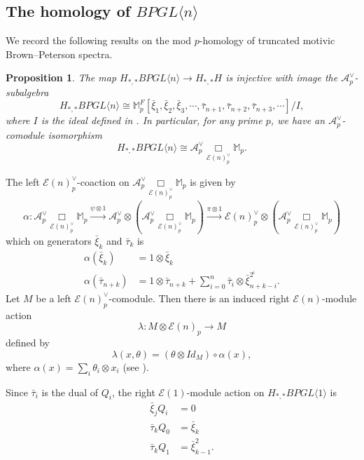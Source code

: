 \documentclass{amsart}
\newtheorem{proposition}[theorem]{Proposition}
\theoremstyle{plain}
\numberwithin{theorem}{section}
\numberwithin{equation}{section}
\numberwithin{figure}{section}
\newcommand{\mM}{{\mathbb M}}
\newcommand{\cA}{{\mathcal A}}
\newcommand{\cE}{{\mathcal E}}
\newcommand{\0}{\langle 0 \rangle }
\begin{document}
\subsection{The homology of $BPGL \langle n \rangle$}
We record the following results on the mod $p$-homology of truncated motivic Brown--Peterson spectra.
\begin{proposition} \cite[Theorem 6.19]{Hoyois15}
\label{prop:BPGLnHomology}
    The map $H_{*,*} BPGL \langle n \rangle \to H_{*,*} H$ is injective with image the $\mathcal{A}^\vee_p$-subalgebra
    \[
    H_{*,*} BPGL \langle n \rangle \cong \mathbb{M}_p^F [\bar{\xi}_1, \bar{\xi}_2, \bar{\xi}_3, \cdots, \bar{\tau}_{n+1}, \bar{\tau}_{n + 2}, \bar{\tau}_{n + 3}, \cdots]/I,
    \]
    where $I$ is the ideal defined in . In particular, for any prime $p$, we have an $\mathcal{A}_p^\vee$-comodule isomorphism 
    \[
    H_{*,*} BPGL \langle n \rangle \cong \cA_p^\vee \underset{\cE(n)^\vee_p}{\Box} \mathbb{M}_p
    .\]
\end{proposition}
The left $\cE(n)_p^\vee$-coaction on $\mathcal{A}_p^\vee \underset{\cE(n)_p^\vee}{\Box} \mM_p$ is given by
\begin{equation} \label{eq:coaction}
    \alpha: \mathcal{A}_p^\vee \underset{\cE(n)_p^\vee}{\Box} {\mM_p} \xrightarrow{\psi \otimes 1} \mathcal{A}_p^\vee \otimes \left(\mathcal{A}_p^\vee \underset{\cE(n)_p^\vee}{\Box} {\mM_p} \right) \xrightarrow{\pi \otimes 1} \cE(n)_p^\vee \otimes \left(\mathcal{A}_p^\vee \underset{\cE(n)_p^\vee}{\Box} \mM_p \right)
\end{equation}
which on generators $\bar{\xi}_k$ and $\bar{\tau}_k$ is 
\begin{align*}
    \alpha (\bar{\xi}_k) & = 1 \otimes \bar{\xi}_k \\
    \alpha (\bar{\tau}_{n + k}) & = 1 \otimes \bar{\tau}_{n + k} + \sum_{i = 0}^n \bar{\tau}_i \otimes \bar{\xi}_{n + k - i}^{2^i}.
\end{align*}
Let $M$ be a left $\cE(n)_p^\vee$-comodule. Then there is an induced right $\cE(n)$-module action 
\[
\lambda: M \otimes \cE(n)_p \to M
\]
defined by
\[
\lambda (x, \theta) = (\theta \otimes Id_M) \circ \alpha (x),
\]
where $\alpha(x) = \sum_i \theta_i \otimes x_i$ (see \cite[]{Boardman82}).

Since $\bar{\tau}_i$ is the dual of $Q_i$, the right $\cE(1)$-module action on $H_{*,*}BPGL \langle 1 \rangle$ is
\begin{align*}
    \bar{\xi}_j Q_i & = 0 \\
    \bar{\tau}_k Q_0 & = \bar{\xi}_k \\
    \bar{\tau}_k Q_1 & = \bar{\xi}_{k -1}^2.
\end{align*}
\end{document}

